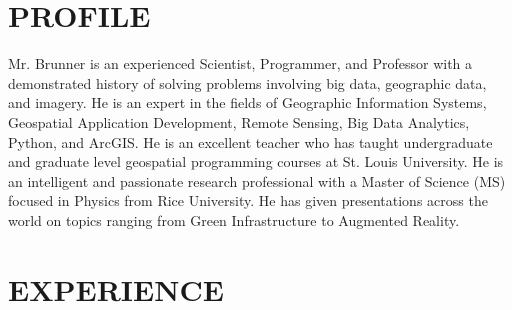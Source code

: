 \documentclass{res}
\begin{document}
 
\address{\bf HOME ADDRESS\\122 Arabian Path\\ 
St. Peters, MO 63376\\ 636-222-3818\\ gregbrunn@gmail.com}
\address{\bf WORK ADDRESS \\ 3060 Little Hills Expy\\  St. Charles, MO 63301\\  636-949-6620 ext. 8557\\
gbrunner@esri.com}
                                  
\begin{resume}
\section{PROFILE}
Mr. Brunner is an experienced Scientist, Programmer, and Professor with a demonstrated history of solving problems involving big data, geographic data, and imagery. He is an expert in the fields of Geographic Information Systems, Geospatial Application Development, Remote Sensing, Big Data Analytics, Python, and ArcGIS. He is an excellent teacher who has taught undergraduate and graduate level geospatial programming courses at St. Louis University. He is an intelligent and passionate research professional with a Master of Science (MS) focused in Physics from Rice University. He has given presentations across the world on topics ranging from Green Infrastructure to Augmented Reality.

\section{EXPERIENCE}
   \vspace{-0.1in}	


\end{resume}
\end{document}
